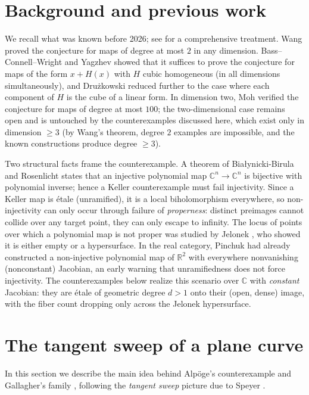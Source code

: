 \documentclass[11pt]{article}
\theoremstyle{plain}
\theoremstyle{definition}
\theoremstyle{remark}
\newcommand{\C}{\mathbb{C}}
\begin{document}
\section{Background and previous work}\label{sec:background}

We recall what was known before 2026; see \cite{Essen2000} for a comprehensive
treatment. Wang \cite{Wang1980} proved the conjecture for maps of degree at most
$2$ in any dimension. Bass--Connell--Wright \cite{BCW1982} and Yagzhev
\cite{Yagzhev1980} showed that it suffices to prove the conjecture for maps of the
form $x+H(x)$ with $H$ cubic homogeneous (in all dimensions simultaneously), and
Dru\.zkowski \cite{Druzkowski1983} reduced further to the case where each
component of $H$ is the cube of a linear form. In dimension two, Moh
\cite{Moh1983} verified the conjecture for maps of degree at most $100$; the
two-dimensional case remains open and is untouched by the counterexamples
discussed here, which exist only in dimension $\ge3$ (by Wang's theorem, degree
$2$ examples are impossible, and the known constructions produce degree $\ge3$).

Two structural facts frame the counterexample. A theorem of
Bia{\l}ynicki-Birula and Rosenlicht \cite{BBR1962} states that an injective
polynomial map $\C^n\to\C^n$ is bijective with polynomial inverse; hence a Keller
counterexample must fail injectivity. Since a Keller map is \'etale (unramified),
it is a local biholomorphism everywhere, so non-injectivity can only occur through
failure of \emph{properness}: distinct preimages cannot collide over any target
point, they can only escape to infinity. The locus of points over which a
polynomial map is not proper was studied by Jelonek \cite{Jelonek1993}, who showed
it is either empty or a hypersurface. In the real category, Pinchuk
\cite{Pinchuk1994} had already constructed a non-injective polynomial map of
$\mathbb{R}^2$ with everywhere nonvanishing (nonconstant) Jacobian, an early
warning that unramifiedness does not force injectivity. The counterexamples below
realize this scenario over $\C$ with \emph{constant} Jacobian: they are \'etale of
geometric degree $d>1$ onto their (open, dense) image, with the fiber count
dropping only across the Jelonek hypersurface.

\section{The tangent sweep of a plane curve}\label{sec:sweep}

In this section we describe the main idea behind Alp\"oge's counterexample and
Gallagher's family \cite{Gallagher2026}, following the \emph{tangent sweep}
picture due to Speyer \cite{Speyer2026}.
\end{document}
